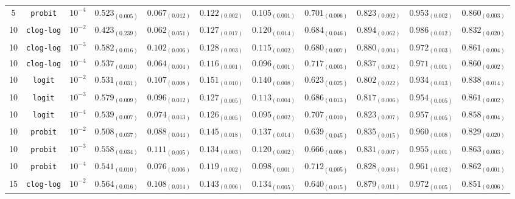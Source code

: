 \documentclass[journal]{IEEEtran}
\begin{document}
\begin{table}[!t]
\begin{tabular}{c@{\hskip 0.15cm}c@{\hskip 0.15cm}c@{\hskip 0.15cm}c@{\hskip 0.30cm}c@{\hskip 0.20cm}c@{\hskip 0.20cm}c@{\hskip 0.20cm}c@{\hskip 0.20cm}c@{\hskip 0.20cm}c@{\hskip 0.20cm}c}
			5 & \texttt{probit} & $10^{-4}$ & $0.523_{(0.005)}$ & $0.067_{(0.012)}$ & $0.122_{(0.002)}$ & $0.105_{(0.001)}$ & $0.701_{(0.006)}$ & $0.823_{(0.002)}$ & $0.953_{(0.002)}$ & $0.860_{(0.003)}$\\
			10 & \texttt{clog-log} & $10^{-2}$ & $0.423_{(0.239)}$ & $0.062_{(0.051)}$ & $0.127_{(0.017)}$ & $0.120_{(0.014)}$ & $0.684_{(0.046)}$ & $\mathbf{0.894_{(0.062)}}$ & $\mathbf{0.986_{(0.012)}}$ & $0.832_{(0.020)}$\\
			10 & \texttt{clog-log} & $10^{-3}$ & $\mathbf{0.582_{(0.016)}}$ & $0.102_{(0.006)}$ & $0.128_{(0.003)}$ & $0.115_{(0.002)}$ & $0.680_{(0.007)}$ & $\mathit{0.880_{(0.004)}}$ & $0.972_{(0.003)}$ & $0.861_{(0.004)}$\\
			10 & \texttt{clog-log} & $10^{-4}$ & $0.537_{(0.010)}$ & $0.064_{(0.004)}$ & $\mathit{0.116_{(0.001)}}$ & $0.096_{(0.001)}$ & $0.717_{(0.003)}$ & $0.837_{(0.002)}$ & $0.971_{(0.001)}$ & $0.860_{(0.002)}$\\
			10 & \texttt{logit} & $10^{-2}$ & $0.531_{(0.031)}$ & $0.107_{(0.008)}$ & $0.151_{(0.010)}$ & $0.140_{(0.008)}$ & $0.623_{(0.025)}$ & $0.802_{(0.022)}$ & $0.934_{(0.013)}$ & $0.838_{(0.014)}$\\
			10 & \texttt{logit} & $10^{-3}$ & $0.579_{(0.009)}$ & $0.096_{(0.012)}$ & $0.127_{(0.005)}$ & $0.113_{(0.004)}$ & $0.686_{(0.013)}$ & $0.817_{(0.006)}$ & $0.954_{(0.005)}$ & $0.861_{(0.002)}$\\
			10 & \texttt{logit} & $10^{-4}$ & $0.539_{(0.007)}$ & $0.074_{(0.013)}$ & $0.126_{(0.005)}$ & $0.095_{(0.002)}$ & $0.707_{(0.010)}$ & $0.823_{(0.007)}$ & $0.957_{(0.005)}$ & $0.858_{(0.004)}$\\
			10 & \texttt{probit} & $10^{-2}$ & $0.508_{(0.037)}$ & $0.088_{(0.044)}$ & $0.145_{(0.018)}$ & $0.137_{(0.014)}$ & $0.639_{(0.045)}$ & $0.835_{(0.015)}$ & $0.960_{(0.008)}$ & $0.829_{(0.020)}$\\
			10 & \texttt{probit} & $10^{-3}$ & $0.558_{(0.034)}$ & $\mathbf{0.111_{(0.005)}}$ & $0.134_{(0.003)}$ & $0.120_{(0.002)}$ & $0.666_{(0.008)}$ & $0.831_{(0.007)}$ & $0.955_{(0.001)}$ & $0.863_{(0.003)}$\\
			10 & \texttt{probit} & $10^{-4}$ & $0.541_{(0.010)}$ & $0.076_{(0.006)}$ & $0.119_{(0.002)}$ & $0.098_{(0.001)}$ & $0.712_{(0.005)}$ & $0.828_{(0.003)}$ & $0.961_{(0.002)}$ & $0.862_{(0.001)}$\\
			15 & \texttt{clog-log} & $10^{-2}$ & $0.564_{(0.016)}$ & $0.108_{(0.014)}$ & $0.143_{(0.006)}$ & $0.134_{(0.005)}$ & $0.640_{(0.015)}$ & $0.879_{(0.011)}$ & $0.972_{(0.005)}$ & $0.851_{(0.006)}$\\

\end{tabular}
\end{table}
\end{document}
